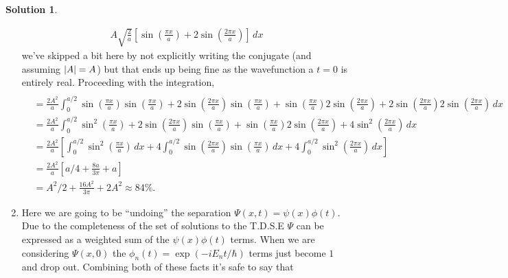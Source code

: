 \documentclass[10pt]{article}
\theoremstyle{definition}
\newtheorem{soln}{Solution}
\begin{document}
\begin{soln}
\begin{enumerate}[label=(\alph*)]
\begin{align*}
            A\sqrt{\frac{2}{a}}\left[\sin\left(\frac{\pi x}{a}\right)+2\sin\left(\frac{2\pi x}{a}\right)\right]\,dx
          \end{align*}
          we've skipped a bit here by not explicitly writing the conjugate (and assuming $\abs{A}=A$) but that ends up being fine as the wavefunction a $t=0$
          is entirely real. Proceeding with the integration,
          \begin{align*}                                                                                                                                                                                                                  \\
             & =\frac{2A^2}{a}\int_{0}^{a/2}\sin\left(\frac{\pi x}{a}\right)\sin\left(\frac{\pi x}{a}\right)+2\sin\left(\frac{2\pi x}{a}\right)\sin\left(\frac{\pi x}{a}\right) + \sin\left(\frac{\pi x}{a}\right)2\sin\left(\frac{2\pi x}{a}\right)+2\sin\left(\frac{2\pi x}{a}\right)2\sin\left(\frac{2\pi x}{a}\right)\,dx \\
             & =\frac{2A^2}{a}\int_{0}^{a/2}\sin^2\left(\frac{\pi x}{a}\right)+2\sin\left(\frac{2\pi x}{a}\right)\sin\left(\frac{\pi x}{a}\right) + \sin\left(\frac{\pi x}{a}\right)2\sin\left(\frac{2\pi x}{a}\right)+4\sin^2\left(\frac{2\pi x}{a}\right)\,dx                                                               \\
             & =\frac{2A^2}{a}\left[\int_{0}^{a/2}\sin^2\left(\frac{\pi x}{a}\right)\,dx +4\int_{0}^{a/2}\sin\left(\frac{2\pi x}{a}\right)\sin\left(\frac{\pi x}{a}\right)\,dx +4\int_{0}^{a/2}\sin^2\left(\frac{2\pi x}{a}\right)\,dx\right]                                                                                 \\
             & =\frac{2A^2}{a}\left[a/4 +\frac{8a}{3\pi} + a\right]                                                                                                                                                                                                                                                           \\
             & =A^2/2 +\frac{16A^2}{3\pi} + 2A^2\approx84\%.
          \end{align*}
    \item Here we are going to be ``undoing'' the separation $\Psi(x,t)=\psi(x)\phi(t)$. Due to the completeness of the
          set of solutions to the T.D.S.E $\Psi$ can be expressed as a weighted sum of the $\psi(x)\phi(t)$ terms. When we are considering
          $\Psi(x,0)$ the $\phi_n(t)=\exp(-iE_nt/\hbar)$ terms just become $1$ and drop out. Combining both of these facts it's safe to say that

\end{enumerate}
\end{soln}
\end{document}
